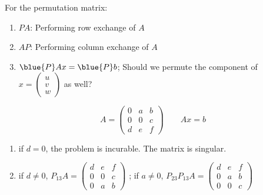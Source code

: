 \begin{note}
    For the permutation matrix:
    \begin{enumerate}[label=$\arabic*^\circ$]
        \item $PA$: Performing row exchange of $A$
        \item $AP$: Performing column exchange of $A$ 
        \item $\blue{P}Ax = \blue{P}b$; Should we permute the component of $x = \begin{pmatrix}u\\v\\w\end{pmatrix}$ as well? 
    \end{enumerate}
\end{note}

\begin{eg}
    \[
    A = \begin{pmatrix}
        0 & a & b \\
        0 & 0 & c \\
        d & e & f
    \end{pmatrix}
    \qquad Ax = b 
    \]
\end{eg}
\begin{enumerate}[label=(\arabic*)]
    \item if $d = 0$, the problem is incurable. The matrix is singular.
    \item if $d \neq 0$, $P_{13}A = \begin{pmatrix}
        d & e & f \\
        0 & 0 & c \\
        0 & a & b 
    \end{pmatrix}$
    ; if $a \neq 0$, $P_{23}P_{13}A = \begin{pmatrix}
        d & e & f \\
        0 & a & b \\
        0 & 0 & c 
    \end{pmatrix}$
\end{enumerate}

\vspace{1em}


